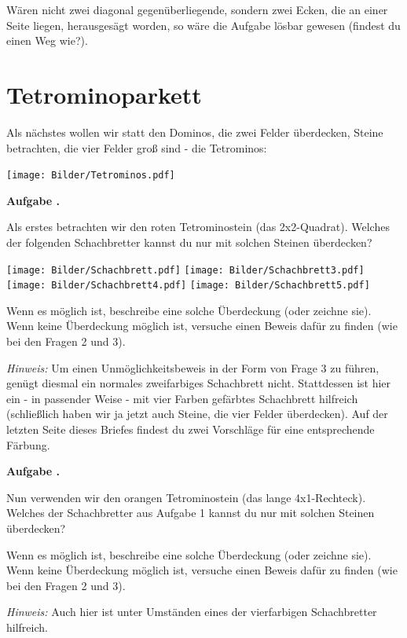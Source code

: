 \documentclass[a4paper,ngerman,12pt]{scrartcl}
\theoremstyle{definition}
\theoremstyle{plain}
\theoremstyle{remark}
\newlength{\aufgabenskip}
\newcounter{aufgabennummer}
\newenvironment{aufgabe}[1]{
	\addtocounter{aufgabennummer}{1}
	\textbf{Aufgabe \theaufgabennummer.} \emph{#1} \par
}{\vspace{\aufgabenskip}}
\begin{document}
Wären nicht zwei diagonal gegenüberliegende, sondern zwei Ecken, die an einer Seite liegen, herausgesägt worden, so wäre die Aufgabe lösbar gewesen (findest du einen Weg wie?).

\section{Tetrominoparkett}

Als nächstes wollen wir statt den Dominos, die zwei Felder überdecken, Steine betrachten, die vier Felder groß sind - die Tetrominos:

\begin{center}
	\texttt{[image: Bilder/Tetrominos.pdf]}
\end{center}

\begin{aufgabe}{}
	Als erstes betrachten wir den roten Tetrominostein (das 2x2-Quadrat). Welches der folgenden Schachbretter kannst du nur mit solchen Steinen überdecken? 
	
	\begin{center}
		\texttt{[image: Bilder/Schachbrett.pdf]}
		\texttt{[image: Bilder/Schachbrett3.pdf]}
		\texttt{[image: Bilder/Schachbrett4.pdf]}
		\texttt{[image: Bilder/Schachbrett5.pdf]}
	\end{center}
	
	Wenn es möglich ist, beschreibe eine solche Überdeckung (oder zeichne sie). Wenn keine Überdeckung möglich ist, versuche einen Beweis dafür zu finden (wie bei den Fragen 2 und 3).
	
	\emph{Hinweis:} Um einen Unmöglichkeitsbeweis in der Form von Frage 3 zu führen, genügt diesmal ein normales zweifarbiges Schachbrett nicht. Stattdessen ist hier ein - in passender Weise - mit vier Farben gefärbtes \glqq Schachbrett\grqq{} hilfreich (schließlich haben wir ja jetzt auch Steine, die vier Felder überdecken). Auf der letzten Seite dieses Briefes findest du zwei Vorschläge für eine entsprechende Färbung.
\end{aufgabe}

\begin{aufgabe}{}
	Nun verwenden wir den orangen Tetrominostein (das lange 4x1-Rechteck). Welches der Schachbretter aus Aufgabe 1 kannst du nur mit solchen Steinen überdecken? 
	
	Wenn es möglich ist, beschreibe eine solche Überdeckung (oder zeichne sie). Wenn keine Überdeckung möglich ist, versuche einen Beweis dafür zu finden (wie bei den Fragen 2 und 3).
	
	\emph{Hinweis:} Auch hier ist unter Umständen eines der vierfarbigen \glqq Schachbretter\grqq{} hilfreich.
\end{aufgabe}
\end{document}
